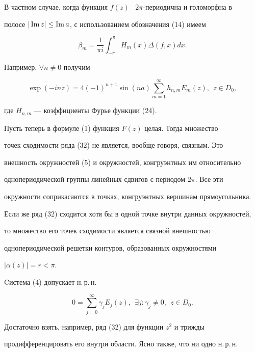  


В частном случае, когда функция $f(z)$ \ $2\pi$-периодична и голоморфна в 


полосе $|\operatorname{Im} z|\le\operatorname{Im} a$, с использованием обозначения (14) имеем 


$$ 


\beta_m=\frac{1}{\pi i}\int^\pi_{-\pi} 


H_m(x)\Delta(f,x)d x. 


$$ 


Например, $\forall n\ne0$ получим 


$$ 


\exp(-in z)=4(-1)^{n+1}\sin(n a) 


\sum^\infty_{m=1} h_{n,m}E_m(z),\ \ z\in D_0, 


$$ 


где $H_{n,m}$ --- коэффициенты Фурье функции (24). 


 


Пусть теперь в формуле (1) функция $F(z)$ целая. Тогда множество  


точек сходимости ряда (32) не является, вообще говоря, связным. Это  


внешность окружностей (5) и окружностей, конгруэнтных им относительно  


однопериодической группы линейных сдвигов с периодом $2\pi$. Все эти  


окружности соприкасаются в точках, конгруэнтных вершинам прямоугольника.  


Если же ряд (32) сходится хотя бы в одной точке внутри данных окружностей,  


то множество его точек сходимости является связной внешностью  


однопериодической решетки контуров, образованных окружностями  


$|\alpha(z)|=r<\pi$. 


 


Cистема (4) допускает н.\,р.\,н. 


$$ 


0=\sum^\infty_{j=0}\gamma_j E_j(z), 


\ \ \exists j:\gamma_j\ne0,\ \ z\in D_0. 


$$ 


Достаточно взять, например, ряд (32) для функции $z^2$ и трижды  


продифференцировать его внутри области. Ясно также, что ни одно н.\,р.\,н.  


